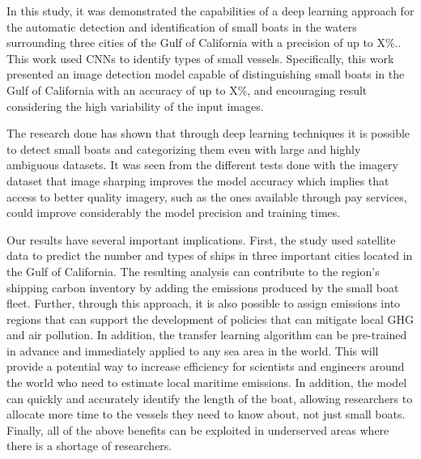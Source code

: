 
In this study, it was demonstrated the capabilities of a deep learning approach for the automatic detection and identification of small boats in the waters surrounding three cities of the Gulf of California  with a precision of up to X\%.. This work used CNNs to identify types of small vessels. Specifically, this work presented an image detection model capable of distinguishing small boats in the Gulf of California with an accuracy of up to X\%, and encouraging result considering the high variability of the input images.

The research done has shown that through deep learning techniques it is possible to detect small boats and categorizing them even with large and highly ambiguous datasets. It was seen from the different tests done with the imagery dataset that image sharping improves the model accuracy which implies that access to better quality imagery, such as the ones available through pay services, could improve considerably the model precision and training times.


Our results have several important implications. First, the study used satellite data to predict the number and types of ships in three important cities located in the Gulf of California. The resulting analysis can contribute to the region's shipping carbon inventory by adding the emissions produced by the small boat fleet. Further, through this approach, it is also possible to assign emissions into regions that can support the development of policies that can mitigate local GHG and air pollution. In addition, the transfer learning algorithm can be pre-trained in advance and immediately applied to any sea area in the world. This will provide a potential way to increase efficiency for scientists and engineers around the world who need to estimate local maritime emissions. In addition, the model can quickly and accurately identify the length of the boat, allowing researchers to allocate more time to the vessels they need to know about, not just small boats. Finally, all of the above benefits can be exploited in underserved areas where there is a shortage of researchers.

